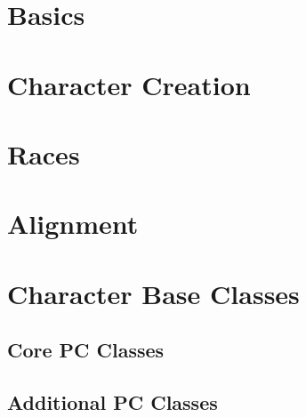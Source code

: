 \documentclass[9pt]{report}
\newcommand{\normalsections}{
\sectionfont{\noindent\rule{\textwidth}{0.015in}\\\nohang}
\subsectionfont{\noindent\rule{\textwidth}{0.005in}\\\nohang}
}
\newcommand{\itemspace}{\setlength{\itemsep}{-1mm}\setlength{\topsep}{-1mm} }
\begin{document}





\pagestyle{fancy}
\linespread{.9}  \small  \normalsize \itemspace \normalsections

\tableofcontents

\chapter{Basics}



\chapter{Character Creation}


\chapter{Races}


\chapter{Alignment}




\chapter{Character Base Classes}

\section{Core PC Classes}


%






%






\section{Additional PC Classes}
\end{document}
